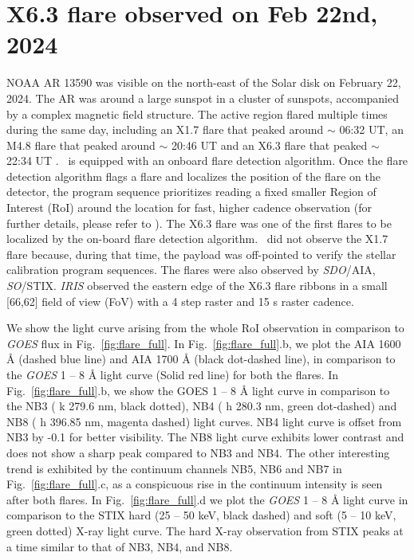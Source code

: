 \section{X6.3 flare observed on Feb 22nd, 2024} \label{sec:feb_22nd}

NOAA AR 13590 was visible on the north-east of the Solar disk on February 22, 2024. The AR was around a large sunspot in a cluster of sunspots, accompanied by a complex magnetic field structure. The active region flared multiple times during the same day, including an X1.7 flare that peaked around $\sim$ 06:32 UT, an M4.8 flare that peaked around $\sim$ 20:46 UT and an X6.3 flare that peaked $\sim$ 22:34 UT . \suit~is equipped with an onboard flare detection algorithm. Once the flare detection algorithm flags a flare and localizes the position of the flare on the detector, the program sequence prioritizes reading a fixed smaller Region of Interest (RoI) around the location for fast, higher cadence observation (for further details, please refer to \cite{flare_det}). The X6.3 flare was one of the first flares to be localized by the on-board flare detection algorithm. \suit~did not observe the X1.7 flare because, during that time, the payload was off-pointed to verify the stellar calibration program sequences. The flares were also observed by {\it SDO}/AIA, {\it SO}/STIX. {\it IRIS} observed the eastern edge of the X6.3 flare ribbons in a small [66\arcsec,62\arcsec] field of view (FoV) with a 4 step raster and 15 s raster cadence.

We show the light curve arising from the whole RoI observation in comparison to {\it GOES} flux in Fig.~\ref{fig:flare_full}. In Fig.~\ref{fig:flare_full}.b, we plot the AIA 1600 {\AA} (dashed blue line) and AIA 1700 {\AA} (black dot-dashed line), in comparison to the {\it GOES} 1 {--} 8 {\AA} light curve (Solid red line) for both the flares. In Fig.~\ref{fig:flare_full}.b, we show the GOES 1 {--} 8 {\AA} light curve in comparison to the NB3 ( k 279.6 nm, black dotted), NB4 ( h 280.3 nm, green dot-dashed) and NB8 ( h 396.85 nm, magenta dashed) light curves. NB4 light curve is offset from NB3 by -0.1 for better visibility. The NB8 light curve exhibits lower contrast and does not show a sharp peak compared to NB3 and NB4. The other interesting trend is exhibited by the continuum channels NB5, NB6 and NB7 in Fig.~\ref{fig:flare_full}.c, as a conspicuous rise in the continuum intensity is seen after both flares. In Fig.~\ref{fig:flare_full}.d we plot the {\it GOES} 1 {--} 8 {\AA} light curve in comparison to the STIX hard (25 {--} 50 keV, black dashed) and soft (5 {--} 10 keV, green dotted) X-ray light curve. The hard X-ray observation from STIX peaks at a time similar to that of NB3, NB4, and NB8.

